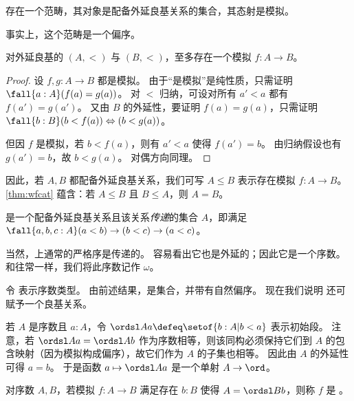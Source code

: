 \begin{cor}\label{thm:wfcat}
  存在一个范畴，其对象是配备外延良基关系的集合，其态射是模拟。
\end{cor}

事实上，这个范畴是一个偏序。

\begin{lem}
  对外延良基的 $(A,<)$ 与 $(B,<)$，至多存在一个模拟 $f:A\to B$。
\end{lem}
\begin{proof}
  设 $f,g:A\to B$ 都是模拟。
  由于“是模拟”是纯性质，只需证明 $\fall{a:A}(f(a)=g(a))$。
  对 $<$ 归纳，可设对所有 $a'<a$ 都有 $f(a')=g(a')$。
  又由 $B$ 的外延性，要证明 $f(a)=g(a)$，只需证明 $\fall{b:B}(b<f(a)) \Leftrightarrow (b<g(a))$。

  但因 $f$ 是模拟，若 $b<f(a)$，则有 $a'<a$ 使得 $f(a')=b$。
  由归纳假设也有 $g(a')=b$，故 $b<g(a)$。
  对偶方向同理。
\end{proof}

因此，若 $A,B$ 都配备外延良基关系，我们可写 $A\le B$ 表示存在模拟 $f:A\to B$。
\cref{thm:wfcat} 蕴含：若 $A\le B$ 且 $B\le A$，则 $A=B$。

\begin{defn}
  是一个配备外延良基关系且该关系\emph{传递}的集合 $A$，即满足 $\fall{a,b,c:A}(a<b)\to (b<c) \to (a<c)$。
\end{defn}

\begin{eg}
  当然，\nat 上通常的严格序是传递的。
  容易看出它也是外延的；因此它是一个序数。
  和往常一样，我们将此序数记作 $\omega$。
\end{eg}

令 \ord 表示序数类型。
由前述结果，\ord 是集合，并带有自然偏序。
现在我们说明 \ord 还可赋予一个良基关系。

若 $A$ 是序数且 $a:A$，令 $\ordsl A a \defeq \setof{ b:A | b<a}$ 表示初始段。
%
注意，若 $\ordsl A a = \ordsl A b$ 作为序数相等，则该同构必须保持它们到 $A$ 的包含映射（因为模拟构成偏序），故它们作为 $A$ 的子集也相等。
因此由 $A$ 的外延性可得 $a=b$。
于是函数 $a\mapsto \ordsl A a$ 是一个单射 $A\to \ord$。

\begin{defn}
  对序数 $A,B$，若模拟 $f:A\to B$ 满足存在 $b:B$ 使得 $A = \ordsl B b$，则称 $f$ 是
  。
\end{defn}

